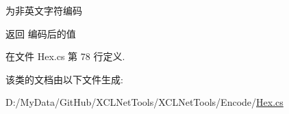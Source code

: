 为非英文字符编码 

\begin{DoxyReturn}{返回}
编码后的值
\end{DoxyReturn}


在文件 Hex.\+cs 第 78 行定义.



该类的文档由以下文件生成\+:\begin{DoxyCompactItemize}
\item 
D\+:/\+My\+Data/\+Git\+Hub/\+X\+C\+L\+Net\+Tools/\+X\+C\+L\+Net\+Tools/\+Encode/\hyperlink{_hex_8cs}{Hex.\+cs}\end{DoxyCompactItemize}
